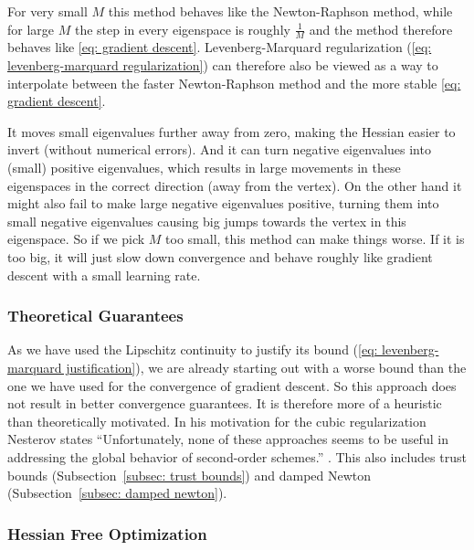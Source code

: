 For very small \(M\) this method behaves like the Newton-Raphson method, while
for large \(M\) the step in every eigenspace is roughly \(\tfrac1M\) and the
method therefore behaves like \ref{eq: gradient descent}. Levenberg-Marquard
regularization (\ref{eq: levenberg-marquard regularization}) can therefore also
be viewed as a way to interpolate between the faster Newton-Raphson method and
the more stable \ref{eq: gradient descent}. 

It moves small eigenvalues further away from zero, making the Hessian easier to invert (without numerical errors). And it can turn negative eigenvalues into
(small) positive eigenvalues, which results in large movements in these
eigenspaces in the correct direction (away from the vertex). On the other hand
it might also fail to make large negative eigenvalues positive, turning them into
small negative eigenvalues causing big jumps towards the vertex in this
eigenspace. So if we pick \(M\) too small, this method can make things worse.
If it is too big, it will just slow down convergence and behave roughly like
gradient descent with a small learning rate. 

\subsubsection{Theoretical Guarantees}

As we have used the Lipschitz continuity to justify its bound (\ref{eq:
levenberg-marquard justification}), we are already starting out with a worse
bound than the one we have used for the convergence of gradient descent. So
this approach does not result in better convergence guarantees. It is
therefore more of a heuristic than theoretically motivated. In his motivation
for the cubic regularization Nesterov states ``Unfortunately,
none of these approaches seems to be useful in addressing the global behavior of
second-order schemes.'' \parencite[p. 242]{nesterovLecturesConvexOptimization2018}.
This also includes trust bounds (Subsection~\ref{subsec: trust bounds}) and
damped Newton (Subsection~\ref{subsec: damped newton}).

\subsubsection{Hessian Free Optimization}

